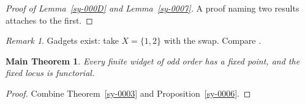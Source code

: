 \documentclass{amsart}
\theoremstyle{plain}
\newtheorem*{mainthm}{Main Theorem}
\theoremstyle{definition}
\theoremstyle{remark}
\newtheorem{remark}[theorem]{Remark}
\begin{document}

\begin{proof}[Proof of Lemma~\ref{sy-000D} and Lemma~\ref{sy-0007}]
A proof naming two results attaches to the first.
\end{proof}

\begin{remark}\label{sy-000A}
Gadgets exist: take $X = \{1,2\}$ with the swap. Compare \cite[Theorem 2.1]{Kre99}.
\end{remark}


\begin{mainthm}\label{sy-000B}
Every finite widget of odd order has a fixed point, and the fixed locus is functorial.
\end{mainthm}
\begin{proof}
Combine Theorem~\ref{sy-0003} and Proposition~\ref{sy-0006}.
\end{proof}




\end{document}
